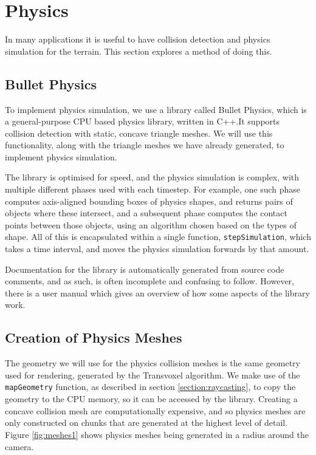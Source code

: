 \documentclass[11pt]{article}
\begin{document}
\section{Physics}
In many applications it is useful to have collision detection and physics simulation for the terrain. This section explores a method of doing this.
\subsection{Bullet Physics}
To implement physics simulation, we use a library called Bullet Physics\cite{bullet-physics}, which is a general-purpose CPU based physics library, written in C++.It supports collision detection with static, concave triangle meshes. We will use this functionality, along with the triangle meshes we have already generated, to implement physics simulation.

The library is optimised for speed, and the physics simulation is complex, with multiple different phases used with each timestep. For example, one such phase computes axis-aligned bounding boxes of physics shapes, and returns pairs of objects where these intersect, and a subsequent phase computes the contact points between those objects, using an algorithm chosen based on the types of shape. All of this is encapsulated within a single function, \texttt{stepSimulation}, which takes a time interval, and moves the physics simulation forwards by that amount.

Documentation for the library is automatically generated from source code comments, and as such, is often incomplete and confusing to follow. However, there is a user manual which gives an overview of how some aspects of the library work\cite{coumans_2015}.

\subsection{Creation of Physics Meshes}
\label{section:physics_meshes}
The geometry we will use for the physics collision meshes is the same geometry used for rendering, generated by the Transvoxel algorithm. We make use of the \texttt{mapGeometry} function, as described in section \ref{section:raycasting}, to copy the geometry to the CPU memory, so it can be accessed by the library.
Creating a concave collision mesh are computationally expensive, and so physics meshes are only constructed on chunks that are generated at the highest level of detail. Figure \ref{fig:meshes1} shows physics meshes being generated in a radius around the camera.
\end{document}
